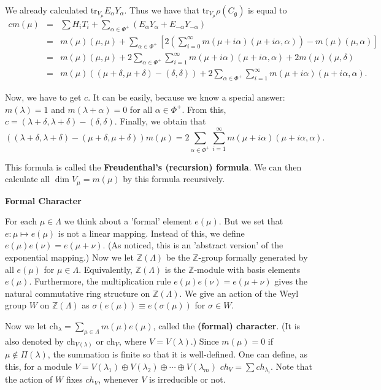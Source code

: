 \documentclass{article}
\newcommand{\InZ}{\mathbb{Z}}
\newcommand{\tru}[2]{\mathrm{tr}_{#1}#2}
\newcommand{\lie}[1]{\mathfrak{#1}}
\begin{document}
We already calculated $\tru{V_\mu}{E_\alpha Y_\alpha}$.
Thus we have that $\tru{V_\mu}{\rho(C_\lie{g})}$ is equal to 
\begin{eqnarray*}
  cm(\mu) &=& \sum H_i T_i + \sum_{\alpha \in \Phi^+} (E_\alpha Y_\alpha + E_{-\alpha} Y_{-\alpha}) \\
  &=& m(\mu) (\mu, \mu) + \sum_{\alpha \in \Phi^+} \left[ 2 \left( \sum_{i = 0}^\infty m(\mu + i\alpha) (\mu + i\alpha, \alpha) \right) - m(\mu)(\mu, \alpha) \right] \\
  &=& m(\mu) (\mu, \mu) + 2 \sum_{\alpha \in \Phi^+} \sum_{i = 1}^\infty m(\mu + i\alpha) (\mu + i\alpha, \alpha) + 2m(\mu)(\mu, \delta) \\
  &=& m(\mu) ( (\mu + \delta, \mu + \delta) - (\delta, \delta) ) + 2 \sum_{\alpha \in \Phi^+} \sum_{i = 1}^\infty m(\mu + i\alpha) (\mu + i\alpha, \alpha).
\end{eqnarray*}

Now, we have to get $c$.
It can be easily, because we know a special answer: $m(\lambda) = 1$ and $m(\lambda + \alpha) = 0$ for all $\alpha \in \Phi^+$.
From this, $c = (\lambda + \delta, \lambda + \delta) - (\delta, \delta)$.
Finally, we obtain that 
\begin{displaymath}
  ((\lambda + \delta, \lambda + \delta) - (\mu + \delta, \mu + \delta))m(\mu) = 2 \sum_{\alpha \in \Phi^+} \sum_{i = 1}^\infty m(\mu + i\alpha) (\mu + i\alpha, \alpha).
\end{displaymath}

This formula is called the \textbf{Freudenthal's (recursion) formula}.
We can then calculate all $\dim{V_\mu} = m(\mu)$ by this formula recursively.

\newpage

\textbf{Formal Character}

For each $\mu \in \Lambda$ we think about a 'formal' element $e(\mu)$.
But we set that $e : \mu \mapsto e(\mu)$ is not a linear mapping.
Instead of this, we define $e(\mu)e(\nu) = e(\mu + \nu)$.
(As noticed, this is an 'abstract version' of the exponential mapping.)
Now we let $\InZ(\Lambda)$ be the $\InZ$-group formally generated by all $e(\mu)$ for $\mu \in \Lambda$.
Equivalently, $\InZ(\Lambda)$ is the $\InZ$-module with basis elements $e(\mu)$.
Furthermore, the multiplication rule $e(\mu)e(\nu) = e(\mu + \nu)$ gives the natural commutative ring structure on $\InZ(\Lambda)$.
We give an action of the Weyl group $W$ on $\InZ(\Lambda)$ as $\sigma(e(\mu)) \equiv e(\sigma(\mu))$ for $\sigma \in W$.

Now we let $\textrm{ch}_\lambda = \sum_{\mu \in \Lambda} m(\mu) e(\mu)$, called the \textbf{(formal) character}.
(It is also denoted by $\textrm{ch}_{V(\lambda)}$ or $\textrm{ch}_V$, where $V = V(\lambda)$.)
Since $m(\mu) = 0$ if $\mu \notin \Pi(\lambda)$, the summation is finite so that it is well-defined.
One can define, as this, for a module $V = V(\lambda_1) \oplus V(\lambda_2) \oplus \cdots \oplus V(\lambda_m)$ $ch_V = \sum ch_{\lambda_i}$.
Note that the action of $W$ fixes $ch_V$, whenever $V$ is irreducible or not.
\end{document}
